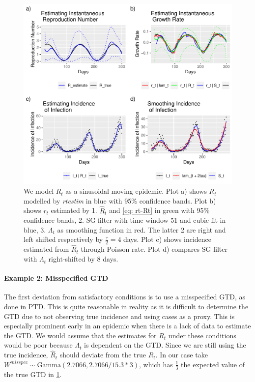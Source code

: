 \documentclass[12pt]{article}
\begin{document}
    \begin{figure}[h]
      \centering
      \includegraphics[scale = 0.75]{epi_paper.pdf}
      \caption{We model $R_t$ as a sinusoidal moving epidemic. Plot a) shows $R_t$ modelled by \textit{rtestim} in blue with 95\% confidence bands. Plot b) shows $r_t$ estimated by 1. $\hat{R}_t$ and \cref{eq: rt-Rt} in green with 95\% confidence bands, 2. SG filter with time window 51 and cubic fit in blue, 3. $\Lambda_t$ as smoothing function in red. The latter 2 are right and left shifted respectively by $\frac{\tau}{2} = 4$ days. Plot c) shows incidence estimated from $\hat{R}_t$ through Poisson rate. Plot d) compares SG filter with $\Lambda_t$ right-shifted by 8 days.}
      \label{fig: paper}
    \end{figure}

    \paragraph{Example 2: Misspecified GTD} The first deviation from satisfactory conditions is to use a misspecified GTD, as done in PTD. 
    This is quite reasonable in reality as it is
    difficult to determine the GTD due to not observing true incidence and using cases as a proxy. 
    This is especially prominent early in an epidemic when there is a lack of data to estimate the GTD. 
    We would assume that the estimates for $R_t$ under these conditions would be poor because $\Lambda_t$ is dependent on the GTD. Since we are still
    using the true incidence, $\hat{R}_t$ should deviate from the true $R_t$. 
    In our case take $W^{misspec} \sim \text{Gamma}(2.7066, 2.7066 / 15.3 * 3)$, which has $\frac{1}{3}$ the expected value of the true GTD in \cref{fig: paper}. 
    
\end{document}
